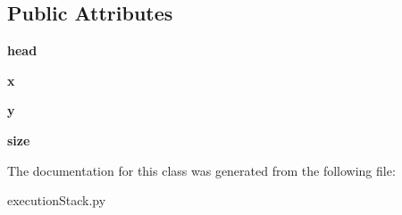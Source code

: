 \subsection*{Public Attributes}
\begin{DoxyCompactItemize}
\item 
{\bfseries head}\hypertarget{classexecution_stack_1_1_function_stack_abf6bc25315b9d735a55a80310fe9a347}{}\label{classexecution_stack_1_1_function_stack_abf6bc25315b9d735a55a80310fe9a347}

\item 
{\bfseries x}\hypertarget{classexecution_stack_1_1_function_stack_ad6baee6eaaab85973dc70879f855be46}{}\label{classexecution_stack_1_1_function_stack_ad6baee6eaaab85973dc70879f855be46}

\item 
{\bfseries y}\hypertarget{classexecution_stack_1_1_function_stack_ab224771bd639966a3972d9c72d7a7718}{}\label{classexecution_stack_1_1_function_stack_ab224771bd639966a3972d9c72d7a7718}

\item 
{\bfseries size}\hypertarget{classexecution_stack_1_1_function_stack_a07903b626e71099c692b91655aee20da}{}\label{classexecution_stack_1_1_function_stack_a07903b626e71099c692b91655aee20da}

\end{DoxyCompactItemize}


The documentation for this class was generated from the following file\+:\begin{DoxyCompactItemize}
\item 
execution\+Stack.\+py\end{DoxyCompactItemize}
